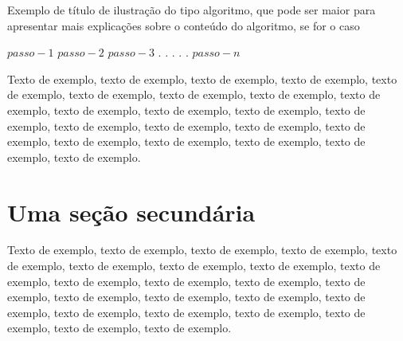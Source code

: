 \documentclass[
	12pt,				%
	oneside,			%
	a4paper,			%
	english,			%
	brazil				%
	]{abntex2ppgsi}
\begin{document}
% 
%
%
%
%
\begin{algorithm}[htbp]
\caption{Exemplo de título de ilustração do tipo algoritmo, que pode ser maior para apresentar mais explicações sobre o conteúdo do algoritmo, se for o caso}
\label{alg:algoritmo-exemplo1}
\begin{algorithmic}[1]
\State $passo-1$
\State $passo-2$
\State $passo-3$
\State $.$
\State $.$
\State $.$
\State $.$
\State $.$
\State $passo-n$
\EndProcedure
\end{algorithmic}
\end{algorithm}


Texto de exemplo, texto de exemplo, texto de exemplo, texto de exemplo, texto de exemplo, texto de exemplo, texto de exemplo, texto de exemplo, texto de exemplo, texto de exemplo, texto de exemplo, texto de exemplo, texto de exemplo, texto de exemplo, texto de exemplo, texto de exemplo, texto de exemplo, texto de exemplo, texto de exemplo, texto de exemplo, texto de exemplo, texto de exemplo.

\section{Uma seção secundária}

Texto de exemplo, texto de exemplo, texto de exemplo, texto de exemplo, texto de exemplo, texto de exemplo, texto de exemplo, texto de exemplo, texto de exemplo, texto de exemplo, texto de exemplo, texto de exemplo, texto de exemplo, texto de exemplo, texto de exemplo, texto de exemplo, texto de exemplo, texto de exemplo, texto de exemplo, texto de exemplo, texto de exemplo, texto de exemplo, texto de exemplo.
\end{document}
